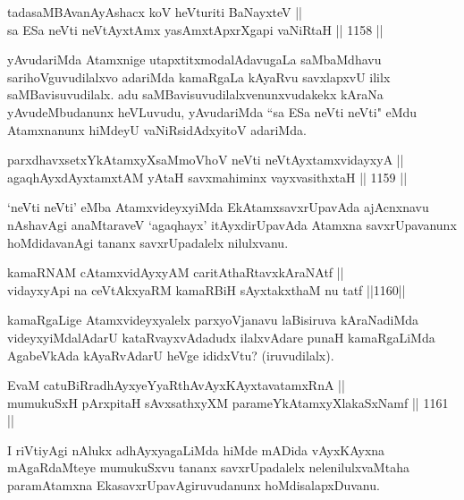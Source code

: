 \begin{shl}
tadasaMBAvanAyAshacx koV heVturiti BaNayxteV || \\
sa ESa neVti neVtAyxtAmx yasAmxtApxrXgapi vaNiRtaH \hfill || 1158 ||  
\end{shl}

\begin{artha}
yAvudariMda Atamxnige utapxtitxmodalAdavugaLa saMbaMdhavu sarihoVguvudilalxvo adariMda kamaRgaLa kAyaRvu savxlapxvU ililx saMBavisuvudilalx. adu saMBavisuvudilalxvenunxvudakekx kAraNa yAvudeMbudanunx heVLuvudu, yAvudariMda ``sa ESa neVti neVti" eMdu Atamxnanunx hiMdeyU vaNiRsidAdxyitoV adariMda.
\end{artha}

\begin{shl}
parxdhavxsetxYkAtamxyXsaMmoVhoV neVti neVtAyxtamxvidayxyA || \\
agaqhAyxdAyxtamxtAM yAtaH savxmahiminx vayxvasithxtaH \hfill || 1159 ||  
\end{shl}

\begin{artha}
`neVti neVti' eMba AtamxvideyxyiMda EkAtamxsavxrUpavAda ajAcnxnavu nAshavAgi anaMtaraveV `agaqhayx' itAyxdirUpavAda Atamxna savxrUpavanunx hoMdidavanAgi tananx savxrUpadalelx nilulxvanu.
\end{artha}


\begin{shl}
kamaRNAM cA\s \s tamxvidAyxyAM caritAthaRtavxkAraNAtf || \\
vidayxyA\s pi na ceVtAkxyaRM kamaRBiH sAyxtakxthaM nu tatf \hfill ||1160||  
\end{shl}

\begin{artha}
kamaRgaLige Atamxvideyxyalelx parxyoVjanavu laBisiruva kAraNadiMda videyxyiMdalAdarU kataRvayxvAdadudx ilalxvAdare punaH kamaRgaLiMda AgabeVkAda kAyaRvAdarU heVge ididxVtu? (iruvudilalx).
\end{artha}

\begin{shl}
EvaM catuBiRradhAyxyeYyaRthAvAyxKAyxtavatamxRnA || \\
mumukuSxH pArxpitaH sAvxsathxyXM parameYkAtamxyXlakaSxNamf \hfill || 1161 ||  
\end{shl}

\begin{artha}
I riVtiyAgi nAlukx adhAyxyagaLiMda hiMde mADida vAyxKAyxna mAgaRdaMteye mumukuSxvu tananx savxrUpadalelx nelenilulxvaMtaha paramAtamxna EkasavxrUpavAgiruvudanunx hoMdisalapxDuvanu.
\end{artha}

